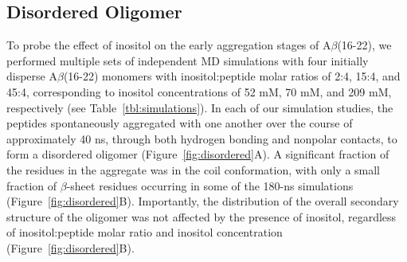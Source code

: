 


\subsection{Disordered Oligomer}

To probe the effect of inositol on the early aggregation stages of A$\beta$(16-22), we performed multiple sets of independent MD simulations with four initially disperse A$\beta$(16-22) monomers with inositol:peptide molar ratios of 2:4, 15:4, and 45:4, corresponding to inositol concentrations of 52 mM, 70 mM, and 209 mM, respectively (see Table~\ref{tbl:simulations}). In each of our simulation studies, the peptides spontaneously aggregated with one another over the course of approximately 40 ns, through both hydrogen bonding and nonpolar contacts, to form a disordered oligomer (Figure~\ref{fig:disordered}A). A significant fraction of the residues in the aggregate was in the coil conformation, with only a small fraction of $\beta$-sheet residues occurring in some of the 180-ns simulations (Figure~\ref{fig:disordered}B). Importantly, the distribution of the overall secondary structure of the oligomer was not affected by the presence of inositol, regardless of inositol:peptide molar ratio and inositol concentration (Figure~\ref{fig:disordered}B).

